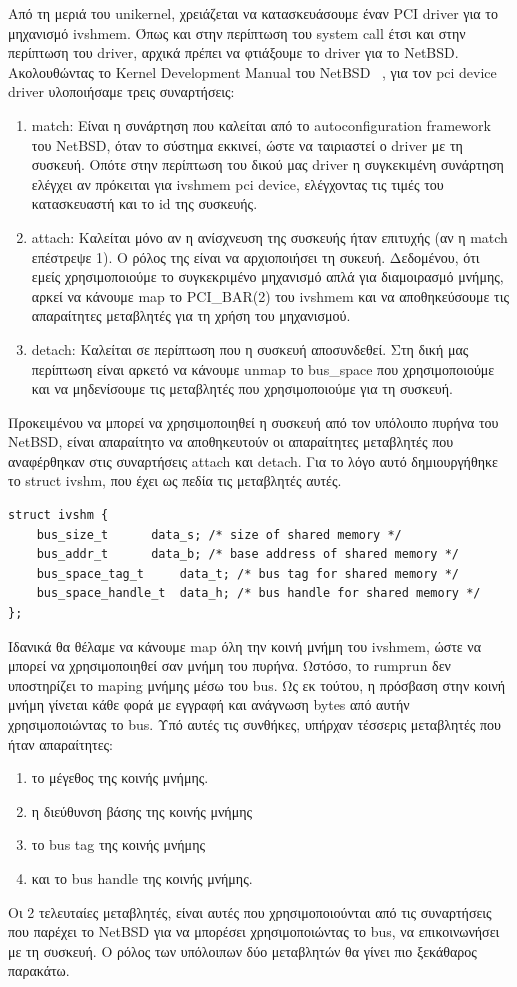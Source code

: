Από τη μεριά του unikernel, χρειάζεται να κατασκευάσουμε έναν PCI driver για το
μηχανισμό ivshmem. Όπως και στην περίπτωση του system call έτσι και στην
περίπτωση του driver, αρχικά πρέπει να φτιάξουμε το driver για το NetBSD. 
Ακολουθώντας το Kernel Development Manual του NetBSD ~\cite{NetBSDKDMDriver},
για τον pci device driver υλοποιήσαμε τρεις συναρτήσεις:
\begin{enumerate}
	\item match: Είναι η συνάρτηση που καλείται από το autoconfiguration
		framework του NetBSD, όταν το σύστημα εκκινεί, ώστε να
		ταιριαστεί ο driver με τη συσκευή. Οπότε στην περίπτωση του
		δικού μας driver η συγκεκιμένη συνάρτηση ελέγχει αν πρόκειται
		για ivshmem pci device, ελέγχοντας τις τιμές του κατασκευαστή
		και το id της συσκευής.
	\item attach: Καλείται μόνο αν η ανίσχνευση της συσκευής ήταν επιτυχής
		(αν η match επέστρεψε 1). Ο ρόλος της είναι να αρχιοποιήσει τη
		συκευή. Δεδομένου, ότι εμείς χρησιμοποιούμε το συγκεκριμένο
		μηχανισμό απλά για διαμοιρασμό μνήμης, αρκεί να κάνουμε map το
		PCI\_BAR(2) του ivshmem και να αποθηκεύσουμε τις απαραίτητες
		μεταβλητές για τη χρήση του μηχανισμού.
	\item detach: Καλείται σε περίπτωση που η συσκευή αποσυνδεθεί. Στη δική
		μας περίπτωση είναι αρκετό να κάνουμε unmap το bus\_space που
		χρησιμοποιούμε και να μηδενίσουμε τις μεταβλητές που
		χρησιμοποιούμε για τη συσκευή.
\end{enumerate}

Προκειμένου να μπορεί να χρησιμοποιηθεί η συσκευή από τον υπόλοιπο πυρήνα του
NetBSD, είναι απαραίτητο να αποθηκευτούν οι απαραίτητες μεταβλητές που
αναφέρθηκαν στις συναρτήσεις attach και detach. Για το λόγο αυτό δημιουργήθηκε
το struct ivshm, που έχει ως πεδία τις μεταβλητές αυτές. 
\begin{lstlisting}[numbers=none]
struct ivshm {
	bus_size_t		data_s;	/* size of shared memory */
	bus_addr_t		data_b;	/* base address of shared memory */
	bus_space_tag_t		data_t;	/* bus tag for shared memory */
	bus_space_handle_t	data_h;	/* bus handle for shared memory */
};
\end{lstlisting}
Ιδανικά θα θέλαμε να κάνουμε map όλη την κοινή μνήμη του ivshmem, ώστε να μπορεί
να χρησιμοποιηθεί σαν μνήμη του πυρήνα. Ωστόσο, το rumprun δεν υποστηρίζει το
maping μνήμης μέσω του bus. Ως εκ τούτου, η πρόσβαση στην κοινή μνήμη γίνεται
κάθε φορά με εγγραφή και ανάγνωση bytes από αυτήν χρησιμοποιώντας το bus. Υπό
αυτές τις συνθήκες, υπήρχαν τέσσερις μεταβλητές που ήταν απαραίτητες:
\begin{enumerate}
	\item το μέγεθος της κοινής μνήμης.
	\item η διεύθυνση βάσης της κοινής μνήμης
	\item το bus tag της κοινής μνήμης
	\item και το bus handle της κοινής μνήμης.
\end{enumerate}
Οι 2 τελευταίες μεταβλητές, είναι αυτές που χρησιμοποιούνται από τις συναρτήσεις
που παρέχει το NetBSD για να μπορέσει χρησιμοποιώντας το bus, να επικοινωνήσει
με τη συσκευή. Ο ρόλος των υπόλοιπων δύο μεταβλητών θα γίνει πιο ξεκάθαρος
παρακάτω.

